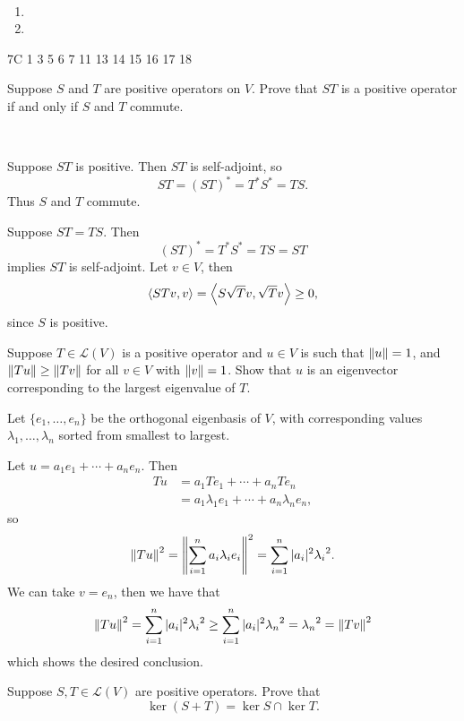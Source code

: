 \begin{solution} \
\begin{enumerate}[label=(\roman*)]
\item 
\item 
\end{enumerate}
\end{solution}

7C 1 3 5 6 7 11 13 14 15 16 17 18

\begin{exercise}
Suppose $S$ and $T$ are positive operators on $V$. Prove that $ST$ is a positive operator if and only if $S$ and $T$ commute.
\end{exercise}

\begin{solution} \

\fbox{$\implies$} Suppose $ST$ is positive. Then $ST$ is self-adjoint, so
\[ST=(ST)^*=T^*S^*=TS.\]
Thus $S$ and $T$ commute.

\fbox{$\impliedby$} Suppose $ST=TS$. Then
\[(ST)^*=T^*S^*=TS=ST\]
implies $ST$ is self-adjoint. Let $v\in V$, then
\[\left\langle STv,v\right\rangle=\left\langle S\sqrt{T}v,\sqrt{T}v\right\rangle\ge0,\]
since $S$ is positive.
\end{solution}

\begin{exercise}
Suppose $T\in\mathcal{L}(V)$ is a positive operator and $u\in V$ is such that $\norm{u}=1$, and $\norm{Tu}\ge\norm{Tv}$ for all $v\in V$ with $\norm{v}=1$. Show that $u$ is an eigenvector corresponding to the largest eigenvalue of $T$.
\end{exercise}

\begin{solution}
Let $\{e_1,\dots,e_n\}$ be the orthogonal eigenbasis of $V$, with corresponding values $\lambda_1,\dots,\lambda_n$ sorted from smallest to largest.

Let $u=a_1e_1+\cdots+a_ne_n$. Then
\begin{align*}
Tu&=a_1Te_1+\cdots+a_nTe_n\\
&=a_1\lambda_1e_1+\cdots+a_n\lambda_ne_n,
\end{align*}
so
\[\norm{Tu}^2=\norm{\sum_{i=1}^{n}a_i\lambda_ie_i}^2=\sum_{i=1}^{n}|a_i|^2{\lambda_i}^2.\]
We can take $v=e_n$, then we have that
\[\norm{Tu}^2=\sum_{i=1}^{n}|a_i|^2{\lambda_i}^2\ge\sum_{i=1}^{n}|a_i|^2{\lambda_n}^2={\lambda_n}^2=\norm{Tv}^2\]
which shows the desired conclusion.
\end{solution}

\begin{exercise}
Suppose $S,T\in\mathcal{L}(V)$ are positive operators. Prove that
\[\ker(S+T)=\ker S\cap\ker T.\]
\end{exercise}


